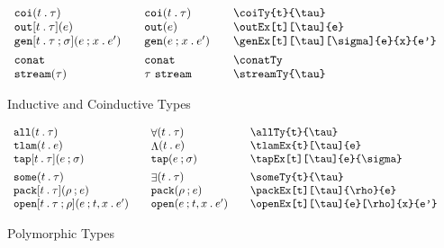 \documentclass[11pt]{article}
\begin{document}
\begin{figure}
\begin{small}
\begin{displaymath}
\begin{array}{l@{\qquad}l@{\qquad}l@{\qquad}l}
        \coiTy{t}{\tau}                            & \coiTy*{t}{\tau}                & \verb|\coiTy{t}{\tau}|                            \\
        \outEx[t][\tau]{e}                         & \outEx*{e}                      & \verb|\outEx[t][\tau]{e}|                         \\
        \genEx[t][\tau][\sigma]{e}{x}{e'}          & \genEx*{e}{x}{e'}               & \verb|\genEx[t][\tau][\sigma]{e}{x}{e'}|          \\[1ex]
  
        \conatTy                                 & \conatTy*                     & \verb|\conatTy|                                   \\
        \streamTy{\tau}                            & \streamTy*{\tau}                & \verb|\streamTy{\tau}|
      \end{array}
    \end{displaymath}
  \end{small}

  \caption{Inductive and Coinductive Types}
  \label{fig:icoi}
\end{figure}

\begin{figure}
  
  \begin{small}
    \begin{displaymath}
      \begin{array}{l@{\qquad}l@{\qquad}l@{\qquad}l}
        \allTy{t}{\tau}                  & \allTy*{t}{\tau}                  & \verb|\allTy{t}{\tau}|                  \\
        \tlamEx{t}[\tau]{e}              & \tlamEx*{t}{e}                    & \verb|\tlamEx{t}[\tau]{e}|               \\
        \tapEx[t][\tau]{e}{\sigma}       & \tapEx*{e}{\sigma}                & \verb|\tapEx[t][\tau]{e}{\sigma}|       \\[1ex]
        \someTy{t}{\tau}                 & \someTy*{t}{\tau}                 & \verb|\someTy{t}{\tau}|                 \\
        \packEx[t][\tau]{\rho}{e}        & \packEx*{\rho}{e}                 & \verb|\packEx[t][\tau]{\rho}{e}|        \\
        \openEx[t][\tau]{e}[\rho]{x}{e'} & \openEx*[t][\tau]{e}[\rho]{x}{e'} & \verb|\openEx[t][\tau]{e}[\rho]{x}{e'}|
      \end{array}
    \end{displaymath}
  \end{small}
  
  \caption{Polymorphic Types}
  \label{fig:poly}
\end{figure}
\end{document}
